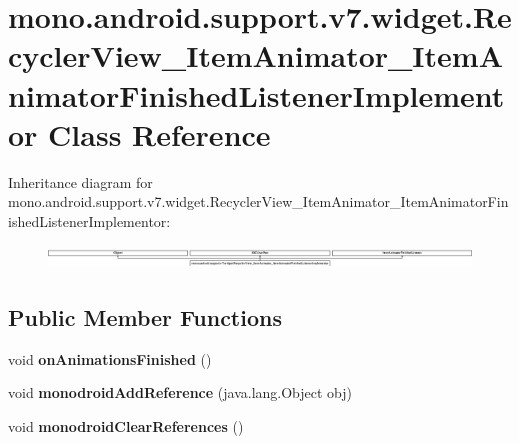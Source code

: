 \hypertarget{classmono_1_1android_1_1support_1_1v7_1_1widget_1_1_recycler_view___item_animator___item_animator_finished_listener_implementor}{}\section{mono.\+android.\+support.\+v7.\+widget.\+Recycler\+View\+\_\+\+Item\+Animator\+\_\+\+Item\+Animator\+Finished\+Listener\+Implementor Class Reference}
\label{classmono_1_1android_1_1support_1_1v7_1_1widget_1_1_recycler_view___item_animator___item_animator_finished_listener_implementor}
Inheritance diagram for mono.\+android.\+support.\+v7.\+widget.\+Recycler\+View\+\_\+\+Item\+Animator\+\_\+\+Item\+Animator\+Finished\+Listener\+Implementor\+:\begin{figure}[H]
\begin{center}
\leavevmode
\includegraphics[height=0.620155cm]{classmono_1_1android_1_1support_1_1v7_1_1widget_1_1_recycler_view___item_animator___item_animator_finished_listener_implementor}
\end{center}
\end{figure}
\subsection*{Public Member Functions}
\begin{DoxyCompactItemize}
\item 
\mbox{\label{classmono_1_1android_1_1support_1_1v7_1_1widget_1_1_recycler_view___item_animator___item_animator_finished_listener_implementor_af2e37040545c954c7e94e7200153ff5f}} 
void {\bfseries on\+Animations\+Finished} ()
\item 
\mbox{\label{classmono_1_1android_1_1support_1_1v7_1_1widget_1_1_recycler_view___item_animator___item_animator_finished_listener_implementor_a01b744e4c5f6525fa3bd405e255c61db}} 
void {\bfseries monodroid\+Add\+Reference} (java.\+lang.\+Object obj)
\item 
\mbox{\label{classmono_1_1android_1_1support_1_1v7_1_1widget_1_1_recycler_view___item_animator___item_animator_finished_listener_implementor_a1853ddf2c642012c0871d0d79c2b09d5}} 
void {\bfseries monodroid\+Clear\+References} ()
\end{DoxyCompactItemize}
